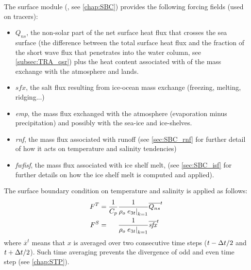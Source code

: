 \documentclass[../main/NEMO_manual]{subfiles}
\begin{document}
The surface module (, see \autoref{chap:SBC}) provides the following forcing fields (used on tracers):

\begin{itemize}
\item
  $Q_{ns}$, the non-solar part of the net surface heat flux that crosses the sea surface
  (\ie the difference between the total surface heat flux and the fraction of the short wave flux that
  penetrates into the water column, see \autoref{subsec:TRA_qsr})
  plus the heat content associated with of the mass exchange with the atmosphere and lands.
\item
  $\textit{sfx}$, the salt flux resulting from ice-ocean mass exchange (freezing, melting, ridging...)
\item
  \textit{emp}, the mass flux exchanged with the atmosphere (evaporation minus precipitation) and
  possibly with the sea-ice and ice-shelves.
\item
  \textit{rnf}, the mass flux associated with runoff
  (see \autoref{sec:SBC_rnf} for further detail of how it acts on temperature and salinity tendencies)
\item
  \textit{fwfisf}, the mass flux associated with ice shelf melt,
  (see \autoref{sec:SBC_isf} for further details on how the ice shelf melt is computed and applied).
\end{itemize}

The surface boundary condition on temperature and salinity is applied as follows:
\begin{equation}
  \label{eq:tra_sbc}
  \begin{alignedat}{2}
    F^T &= \frac{1}{C_p} &\frac{1}{\rho_o \left. e_{3t} \right|_{k = 1}} &\overline{Q_{ns}      }^t \\
    F^S &=               &\frac{1}{\rho_o \left. e_{3t} \right|_{k = 1}} &\overline{\textit{sfx}}^t
  \end{alignedat}
\end{equation}
where $\overline x^t$ means that $x$ is averaged over two consecutive time steps
($t - \Delta t / 2$ and $t + \Delta t / 2$).
Such time averaging prevents the divergence of odd and even time step (see \autoref{chap:STP}).
\end{document}
